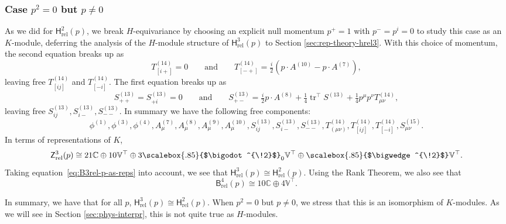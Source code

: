 \documentclass[11pt,reqno,a4paper,final]{amsart}
\newcommand\ext[1]{\scalebox{.85}{$\bigwedge^{\!#1}$}}
\newcommand\sym[1]{\scalebox{.85}{$\bigodot^{\!#1}$}}
\theoremstyle{plain}
\theoremstyle{definition}
\newcommand{\Hrel}{\mathsf{H}_{\mathrm{rel}}}
\newcommand{\Brel}{\mathsf{B}_{\mathrm{rel}}}
\newcommand{\Zrel}{\mathsf{Z}_{\mathrm{rel}}}
\newcommand{\tr}{\operatorname{tr}}
\newcommand{\VV}{\mathbb{V}}
\newcommand{\CC}{\mathbb{C}}
\newcommand{\1}{\mathbb{1}}
\numberwithin{equation}{section}
\begin{document}
\subsubsection{Case $p^2=0$ but $p\neq 0$}
\label{sec:case-p2=0-but}

As we did for $\Hrel^2(p)$, we break $H$-equivariance by choosing an explicit null momentum $p^+ =1$ with $p^- = p^i = 0$ to study this case as an $K$-module, deferring the analysis of the $H$-module structure of $\Hrel^3(p)$ to Section \ref{sec:rep-theory-hrel3}. With this choice of momentum, the second equation breaks up as
\begin{equation}
    T^{(14)}_{[i +]}  = 0  \qquad\text{and}\qquad T^{(14)}_{[-+]} = \tfrac{i}2  (p \cdot A^{(10)} - p \cdot A^{(7)}),
\end{equation}
leaving free $T^{(14)}_{[ij]}$ and $T^{(14)}_{[-i]}$.  The first
equation breaks up as
\begin{equation}
  S^{(13)}_{++} = S^{(13)}_{+i} = 0 \qquad\text{and}\qquad S^{(13)}_{+-} = \tfrac{i}2 p \cdot A^{(8)} + \tfrac14 \tr^\top S^{(13)} + \tfrac14 p^\mu p^\nu T^{(14)}_{\mu\nu},
\end{equation}
leaving free $S^{(13)}_{ij}, S^{(13)}_{i-}, S^{(13)}_{--}$.  In
summary we have the following free components:
\begin{equation}
  \phi^{(1)},\phi^{(3)},\phi^{(4)},A^{(7)}_\mu, A^{(8)}_\mu, A^{(9)}_\mu, A^{(10)}_\mu, S^{(13)}_{ij}, S^{(13)}_{i-},S^{(13)}_{--}, T^{(14)}_{(\mu\nu)}, T^{(14)}_{[ij]}, T^{(14)}_{[-i]}, S^{(15)}_{\mu\nu}.
\end{equation}
In terms of representations of $K$,
\begin{equation}
  \label{eq:Z3rel-as-reps}
  \Zrel^3(p) \cong 21 \CC \oplus 10 \VV^\top \oplus 3 \sym{2}_0 \VV^\top \oplus \ext{2} \VV^\top.
\end{equation}
Taking equation~\eqref{eq:B3rel-p-as-reps} into account, we see that
$\Hrel^3(p) \cong \Hrel^2(p)$.  Using the Rank Theorem, we also see
that
\begin{equation}
  \label{eq:B4rel-p-as-reps}
  \Brel^4(p) \cong 10 \CC \oplus 4 \VV^\top.
\end{equation}

In summary, we have that for all $p$, $\Hrel^3(p) \cong \Hrel^2(p)$. When $p^2 = 0$ but $p\neq 0$, we stress that this is an isomorphism of $K$-modules. As we will see in Section \ref{sec:phys-interpr}, this is not quite true as $H$-modules. 
\end{document}
